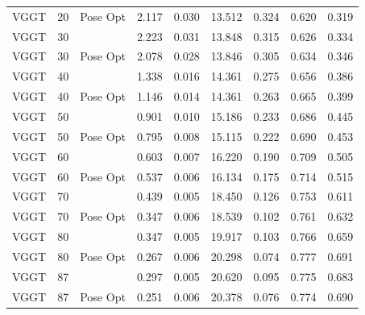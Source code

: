 \begin{table}[H]
\begin{tabular}{lrlrrrrrr}
VGGT & 20 & Pose Opt & 2.117 & 0.030 & 13.512 & 0.324 & 0.620 & 0.319 \\
VGGT & 30 &  & 2.223 & 0.031 & 13.848 & 0.315 & 0.626 & 0.334 \\
VGGT & 30 & Pose Opt & 2.078 & 0.028 & 13.846 & 0.305 & 0.634 & 0.346 \\
VGGT & 40 &  & 1.338 & 0.016 & 14.361 & 0.275 & 0.656 & 0.386 \\
VGGT & 40 & Pose Opt & 1.146 & 0.014 & 14.361 & 0.263 & 0.665 & 0.399 \\
VGGT & 50 &  & 0.901 & 0.010 & 15.186 & 0.233 & 0.686 & 0.445 \\
VGGT & 50 & Pose Opt & 0.795 & 0.008 & 15.115 & 0.222 & 0.690 & 0.453 \\
VGGT & 60 &  & 0.603 & 0.007 & 16.220 & 0.190 & 0.709 & 0.505 \\
VGGT & 60 & Pose Opt & 0.537 & 0.006 & 16.134 & 0.175 & 0.714 & 0.515 \\
VGGT & 70 &  & 0.439 & 0.005 & 18.450 & 0.126 & 0.753 & 0.611 \\
VGGT & 70 & Pose Opt & 0.347 & 0.006 & 18.539 & 0.102 & 0.761 & 0.632 \\
VGGT & 80 &  & 0.347 & 0.005 & 19.917 & 0.103 & 0.766 & 0.659 \\
VGGT & 80 & Pose Opt & 0.267 & 0.006 & 20.298 & 0.074 & 0.777 & 0.691 \\
VGGT & 87 &  & 0.297 & 0.005 & 20.620 & 0.095 & 0.775 & 0.683 \\
VGGT & 87 & Pose Opt & 0.251 & 0.006 & 20.378 & 0.076 & 0.774 & 0.690 \\
\bottomrule
\end{tabular}
\end{table}